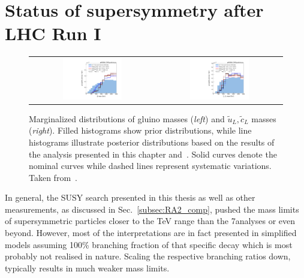 \section{Status of supersymmetry after LHC Run I}
\label{sec:susy_status}
\begin{figure}[!t]
  \centering
  \begin{tabular}{cc}
                \includegraphics[width=0.49\textwidth]{figures/pMSSM_gluino.pdf} &
                \includegraphics[width=0.49\textwidth]{figures/pMSSM_squark.pdf} 
  \end{tabular}
\caption{Marginalized distributions of gluino masses (\textit{left}) and $\tilde{u}_L,\tilde{c}_L$ masses (\textit{right}). Filled histograms show prior distributions, while line histograms illustrate posterior distributions based on the results of the analysis presented in this chapter and~\cite{Chatrchyan:2012lia}. Solid curves denote the nominal curves while dashed lines represent systematic variations. Taken from~\cite{CMS-PAS-SUS-13-020}.} 
  \label{fig:pMSSM}
\end{figure}
In general, the SUSY search presented in this thesis as well as other measurements, as discussed in Sec.~\ref{subsec:RA2_comp}, pushed the mass limits of supersymmetric particles closer to the TeV range than the 7\tev analyses or even beyond. However, most of the interpretations are in fact presented in simplified models assuming 100\% branching fraction of that specific decay which is most probably not realised in nature. Scaling the respective branching ratios down, typically results in much weaker mass limits. \\
